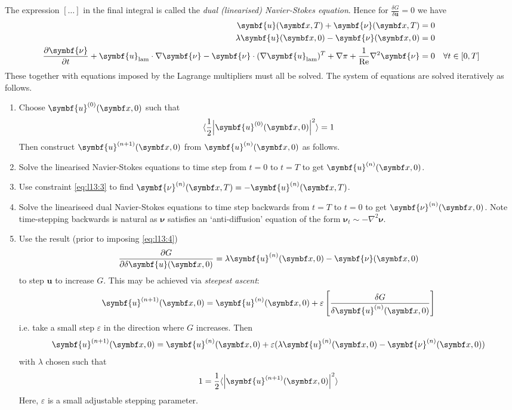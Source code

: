 \documentclass{jknotes}
\renewcommand{\u}{\symbf{u}}
\newcommand{\ReN}{\text{Re}}
\newcommand{\veps}{\varepsilon}
\begin{document}
The expression $\left[\dots\right]$ in the final integral is called the
\emph{dual (linearised) Navier-Stokes equation}. Hence for $\frac{\delta
G}{\delta \u} = 0$ we have
\begin{align}
	\u(\x, T) + \symbf{\nu}(\x, T) &= 0 \label{eq:l13:3} \\
	\lambda \u(\x, 0) - \symbf{\nu}(\x, 0) &= 0 \label{eq:l13:4}\\
	\frac{\partial \symbf{\nu}}{\partial t} + \u_{\text{lam}} \cdot \nabla
	\symbf{\nu} - \symbf{\nu} \cdot (\nabla \u_{\text{lam}})^T + \nabla \pi +
	\frac{1}{\ReN} \nabla^2 \symbf{\nu} &= 0 \hspace{1em}\forall t \in
	\left[0,T\right] \label{eq:l13:5}
\end{align}
These together with equations imposed by the Lagrange multipliers must all be
solved. The system of equations are solved iteratively as follows.
\begin{enumerate}
	\item Choose $\u^{(0)}(\x, 0)$ such that 
		\begin{equation}
			\langle \frac{1}{2}\abs{\u^{(0)}(\x, 0)}^2\rangle = 1
		\end{equation}
		Then construct $\u^{(n+1)}(\x,0)$ from $\u^{(n)}(\x,0)$ as follows.
	\item Solve the linearised Navier-Stokes equations to time step from $t=0$
		to $t=T$ to get $\u^{(n)}(\x,0)$.
	\item Use constraint \eqref{eq:l13:3} to find $\symbf{\nu}^{(n)}(\x,T) =
		-\u^{(n)}(\x, T)$.
	\item Solve the lineariseed dual Navier-Stokes equations to time step
		backwards from $t=T$ to $t=0$ to get $\symbf{\nu}^{(n)}(\x,0)$. Note
		time-stepping backwards is natural as $\symbf{\nu}$ satisfies an
		`anti-diffusion' equation of the form $\symbf{\nu}_t \sim -\nabla^2
		\symbf{\nu}$.
	\item Use the result (prior to imposing \eqref{eq:l13:4})
		\begin{equation}
			\frac{\partial G}{\partial \delta \u(\x,0)} = \lambda
			\u^{(n)}(\x,0) - \symbf{\nu}(\x, 0)
		\end{equation}
		to step $\u$ to increase $G$. This may be achieved via \emph{steepest
		ascent}:
		\begin{equation}
			\u^{(n+1)}(\x,0) = \u^{(n)}(\x,0) + \veps \left[ \frac{\delta
			G}{\delta \u^{(n)}(\x,0)}\right]
		\end{equation}
		i.e. take a small step $\veps$ in the direction where $G$ increases.
		Then
		\begin{equation}
			\u^{(n+1)}(\x,0) = \u^{(n)}(\x,0) + \veps(\lambda \u^{(n)}(\x,0) -
			\symbf{\nu}^{(n)}(\x,0))
		\end{equation}
		with $\lambda$ chosen such that 
		\begin{equation}
			 1 = \frac{1}{2}\langle \abs{\u^{(n+1)}(\x,0)}^2\rangle
		 \end{equation}
		 Here, $\veps$ is a small adjustable stepping parameter.
\end{enumerate}
\end{document}
